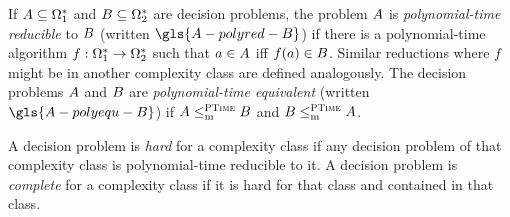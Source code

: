 
If $A \subseteq \Omega^{*}_1$ and $B \subseteq \Omega^{*}_2$ are
decision problems, the problem $A$ is \emph{polynomial-time reducible} to
$B$ (written $\gls{A-polyred-B}$) if there is a polynomial-time algorithm
$f : \Omega^{*}_1 \to \Omega^{*}_2$ such that $a \in A$ iff
$f(a) \in B$.
Similar reductions where $f$ might be in another complexity class are defined
analogously.
The decision problems $A$ and $B$ are \emph{polynomial-time equivalent}
(written $\gls{A-polyequ-B}$) if $A \leq_{\mathrm{m}}^{\text{\normalfont{\scshape PTime}}} B$ and $B \leq_{\mathrm{m}}^{\text{\normalfont{\scshape PTime}}} A$.

A decision problem is \emph{hard} for a complexity class if any decision problem
of that complexity class is polynomial-time reducible to it. A decision problem
is \emph{complete} for a complexity class if it is hard for that class and
contained in that class.